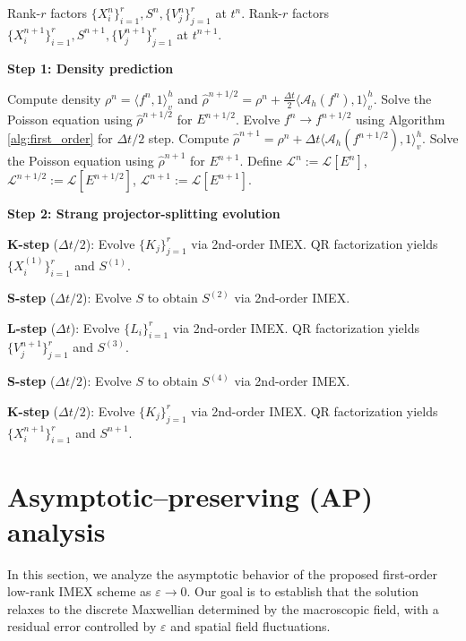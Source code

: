 \documentclass[]{article}
\newcommand{\AlgPhase}[1]{%
  \vspace{0.3em} %
  \Statex \textbf{#1} %
  \vspace{0.1em} %
}
\numberwithin{equation}{section}
\begin{document}
\begin{algorithm}
\caption{Second-order low-rank IMEX scheme}
\label{alg:second_order}
\begin{algorithmic}[1]
\Require Rank-$r$ factors $\{X^n_i\}_{i=1}^{r}, S^n, \{V^n_j\}_{j=1}^{r}$ at $t^n$.
\Ensure Rank-$r$ factors $\{X^{n+1}_i\}_{i=1}^{r}, S^{n+1}, \{V^{n+1}_j\}_{j=1}^{r}$ at $t^{n+1}$.

\AlgPhase{Step 1: Density prediction}
    \State Compute density $\rho^n = \langle f^n, 1 \rangle_v^h$ and $\hat{\rho}^{n+1/2} = \rho^n + \frac{\Delta t}{2} \langle \mathcal{A}_h(f^n), 1 \rangle_v^h$.
    \State Solve the Poisson equation using $\hat{\rho}^{n+1/2}$ for $E^{n+1/2}$.
    \State Evolve $f^n \to f^{n+1/2}$ using Algorithm \ref{alg:first_order} for $\Delta t/2$ step.
    \State Compute $\hat{\rho}^{n+1} = \rho^n + \Delta t \langle \mathcal{A}_h(f^{n+1/2}), 1 \rangle_v^h$. 
    \State Solve the Poisson equation using $\hat{\rho}^{n+1}$ for $E^{n+1}$.
    \State Define $\mathcal{L}^n := \mathcal{L}[E^n]$, $\mathcal{L}^{n+1/2} := \mathcal{L}[E^{n+1/2}]$, $\mathcal{L}^{n+1} := \mathcal{L}[E^{n+1}]$.

\AlgPhase{Step 2: Strang projector-splitting evolution}
    \State \textbf{K-step} ($\Delta t/2$): Evolve $\{K_j\}_{j=1}^{r}$ via 2nd-order IMEX.
    \State {} QR factorization yields $\{X^{(1)}_i\}_{i=1}^{r}$ and $S^{(1)}$.

    \State \textbf{S-step} ($\Delta t/2$): Evolve $S$ to obtain $S^{(2)}$ via 2nd-order IMEX.

    \State \textbf{L-step} ($\Delta t$): \phantom{/2} Evolve $\{L_i\}_{i=1}^{r}$ via 2nd-order IMEX.
    \State {} QR factorization yields $\{V^{n+1}_j\}_{j=1}^{r}$ and $S^{(3)}$.

    \State \textbf{S-step} ($\Delta t/2$): Evolve $S$ to obtain $S^{(4)}$ via 2nd-order IMEX.

    \State \textbf{K-step} ($\Delta t/2$): Evolve $\{K_j\}_{j=1}^{r}$ via 2nd-order IMEX.
    \State {} QR factorization yields $\{X^{n+1}_i\}_{i=1}^{r}$ and $S^{n+1}$.
\end{algorithmic}
\end{algorithm}

\section{Asymptotic--preserving (AP) analysis}
\label{sec:AP}

In this section, we analyze the asymptotic behavior of the proposed first-order low-rank IMEX scheme as $\varepsilon \to 0$. Our goal is to establish that the solution relaxes to the discrete Maxwellian determined by the macroscopic field, with a residual error controlled by $\varepsilon$ and spatial field fluctuations.
\end{document}
